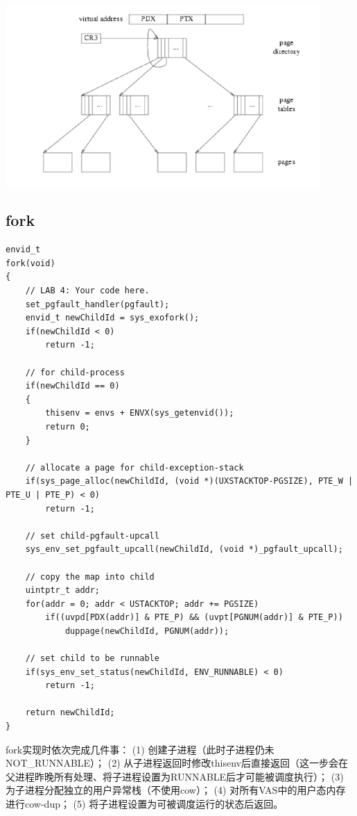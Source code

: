 \documentclass[12pt, letterpaper]{report}
\begin{document}
\quad \par  
{
\centering
\includegraphics[width=0.9\textwidth]{uvpt} \par
}

\newpage

\subsection{fork}
\lstset{style=CStyle}
\setmainfont{Consolas}
\begin{lstlisting}
envid_t
fork(void)
{
    // LAB 4: Your code here.
    set_pgfault_handler(pgfault);
    envid_t newChildId = sys_exofork();
    if(newChildId < 0)
        return -1;
    
    // for child-process
    if(newChildId == 0)
    {
        thisenv = envs + ENVX(sys_getenvid());
        return 0;
    }

    // allocate a page for child-exception-stack
    if(sys_page_alloc(newChildId, (void *)(UXSTACKTOP-PGSIZE), PTE_W | PTE_U | PTE_P) < 0)
        return -1;
    
    // set child-pgfault-upcall
    sys_env_set_pgfault_upcall(newChildId, (void *)_pgfault_upcall);

    // copy the map into child
    uintptr_t addr;
    for(addr = 0; addr < USTACKTOP; addr += PGSIZE)
        if((uvpd[PDX(addr)] & PTE_P) && (uvpt[PGNUM(addr)] & PTE_P))
            duppage(newChildId, PGNUM(addr));

    // set child to be runnable
    if(sys_env_set_status(newChildId, ENV_RUNNABLE) < 0)
        return -1;

    return newChildId;
}
\end{lstlisting}
\setmainfont{Times New Roman}

fork实现时依次完成几件事：
(1) 创建子进程（此时子进程仍未NOT\_RUNNABLE）；
(2) 从子进程返回时修改thisenv后直接返回（这一步会在父进程昨晚所有处理、将子进程设置为RUNNABLE后才可能被调度执行）；
(3) 为子进程分配独立的用户异常栈（不使用cow）；
(4) 对所有VAS中的用户态内存进行cow-dup；
(5) 将子进程设置为可被调度运行的状态后返回。
\par 
\end{document}
